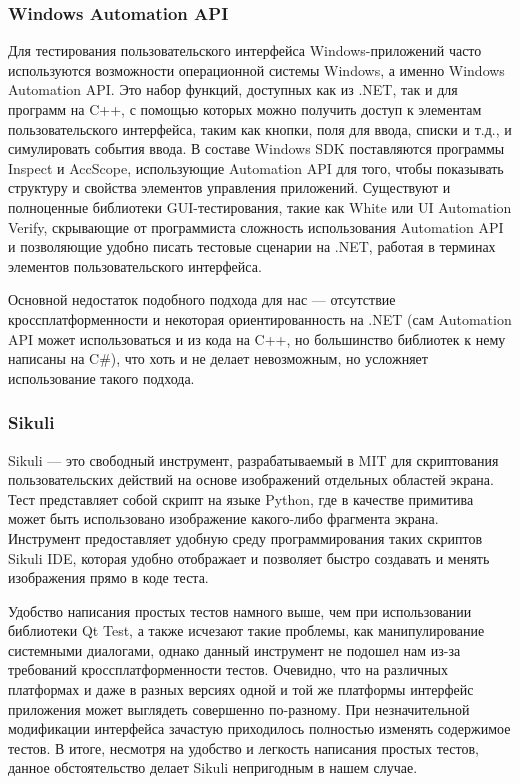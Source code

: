 \documentclass[conference]{IEEEtran}
\begin{document}
\subsubsection{Windows Automation API}
Для тестирования пользовательского интерфейса Windows-приложений часто используются 
возможности операционной системы Windows, а именно Windows Automation API. Это набор 
функций, доступных как из .NET, так и для программ на C++, с помощью которых можно 
получить доступ к элементам пользовательского интерфейса, таким как кнопки, поля для 
ввода, списки и т.д., и симулировать события ввода. В составе Windows SDK поставляются 
программы Inspect и AccScope, использующие Automation API для того, чтобы показывать 
структуру и свойства элементов управления приложений. Существуют и полноценные библиотеки 
GUI-тестирования, такие как White или UI Automation Verify, скрывающие от программиста 
сложность использования Automation API и позволяющие удобно писать тестовые сценарии на 
.NET, работая в терминах элементов пользовательского интерфейса.

Основной недостаток подобного подхода для нас --- отсутствие кроссплатформенности 
и некоторая ориентированность на .NET (сам Automation API может использоваться и из 
кода на C++, но большинство библиотек к нему написаны на C\#), что хоть и не делает 
невозможным, но усложняет использование такого подхода.

\subsubsection{Sikuli}
Sikuli --- это свободный инструмент, разрабатываемый в MIT для скриптования пользовательских 
действий на основе изображений отдельных областей экрана. Тест представляет собой 
скрипт на языке Python, где в качестве примитива может быть использовано изображение 
какого-либо фрагмента экрана. Инструмент предоставляет удобную среду программирования 
таких скриптов Sikuli IDE, которая удобно отображает и позволяет быстро создавать 
и менять изображения прямо в коде теста.

Удобство написания простых тестов намного выше, чем при использовании библиотеки Qt Test, 
а также исчезают такие проблемы, как манипулирование системными диалогами, однако 
данный инструмент не подошел нам из-за требований кроссплатформенности тестов. Очевидно, 
что на различных платформах и даже в разных версиях одной и той же платформы интерфейс 
приложения может выглядеть совершенно по-разному. При незначительной модификации интерфейса 
зачастую приходилось полностью изменять содержимое тестов. В итоге, несмотря на удобство 
и легкость написания простых тестов, данное обстоятельство делает Sikuli непригодным в нашем случае.
\end{document}
